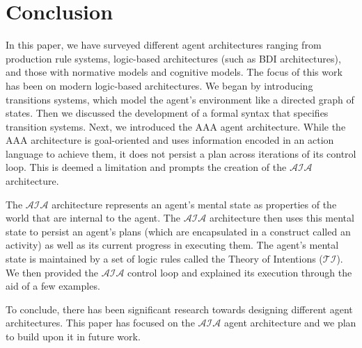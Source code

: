 \chapter{Conclusion}

%
%
%
%

In this paper, we have surveyed different agent architectures ranging from production rule systems, logic-based architectures (such as BDI architectures), and those with normative models and cognitive models.
The focus of this work has been on modern logic-based architectures.
We began by introducing transitions systems, which model the agent's environment like a directed graph of states.
Then we discussed the development of a formal syntax that specifies transition systems.
Next, we introduced the AAA agent architecture.
While the AAA architecture is goal-oriented and uses information encoded in an action language to achieve them, it does not persist a plan across iterations of its control loop.
This is deemed a limitation and prompts the creation of the $\mathcal{AIA}$ architecture.

The $\mathcal{AIA}$ architecture represents an agent's mental state as properties of the world that are internal to the agent.
The $\mathcal{AIA}$ architecture then uses this mental state to persist an agent's plans (which are encapsulated in a construct called an activity) as well as its current progress in executing them.
The agent's mental state is maintained by a set of logic rules called the Theory of Intentions ($\mathcal{TI}$).
We then provided the $\mathcal{AIA}$ control loop and explained its execution through the aid of a few examples.

To conclude, there has been significant research towards designing different agent architectures.
This paper has focused on the $\mathcal{AIA}$ agent architecture and we plan to build upon it in future work.
